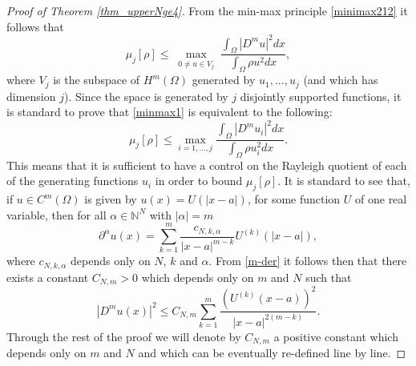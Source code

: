 \documentclass[11pt,a4paper]{amsart}
\numberwithin{equation}{section}
\begin{document}
\begin{proof}[Proof of Theorem \ref{thm_upperNge4}]
From the min-max principle \eqref{minimax212} it follows that
\begin{equation}\label{minmax1}
\mu_{j}[\rho]\leq\max_{\substack{0\ne u\in V_j}}\frac{\int_{\Omega}|D^mu|^2dx}{\int_{\Omega}\rho u^2dx},
\end{equation}
where $V_j$ is the subspace of $H^m(\Omega)$ generated by $u_1,...,u_j$ (and which has dimension $j$). Since the space is generated by $j$ disjointly supported functions, it is standard to prove that \eqref{minmax1} is equivalent to the following:
\begin{equation}\label{minmax2}
\mu_{j}[\rho]\leq\max_{i=1,...,j}\frac{\int_{\Omega}|D^m u_i|^2dx}{\int_{\Omega}\rho u_i^2dx}.
\end{equation}
This means that it is sufficient to have a control on the Rayleigh quotient of each of the generating functions $u_i$ in order to bound $\mu_j[\rho]$. It is standard to see that, if $u\in C^m(\Omega)$ is given by $u(x)=U(|x-a|)$, for some function $U$ of one real variable, then for all $\alpha\in\mathbb N^N$ with $|\alpha|=m$
\begin{equation}\label{m-der}
{\partial^{\alpha}u(x)}=\sum_{k=1}^m\frac{c_{N,k,\alpha}}{|x-a|^{m-k}}U^{(k)}(|x-a|),
\end{equation}
where $c_{N,k,\alpha}$ depends only on $N$, $k$ and $\alpha$. From \eqref{m-der} it follows then that there exists a constant $C_{N,m}>0$ which depends only on $m$ and $N$ such that
\begin{equation}\label{m-der-est}
|D^m u(x)|^2\leq C_{N,m}\sum_{k=1}^m\frac{(U^{(k)}(x-a))^2}{|x-a|^{2(m-k)}}.
\end{equation}
Through the rest of the proof we will denote by $C_{N,m}$ a positive constant which depends only on $m$ and $N$ and which can be eventually re-defined line by line.


\end{proof}
\end{document}
